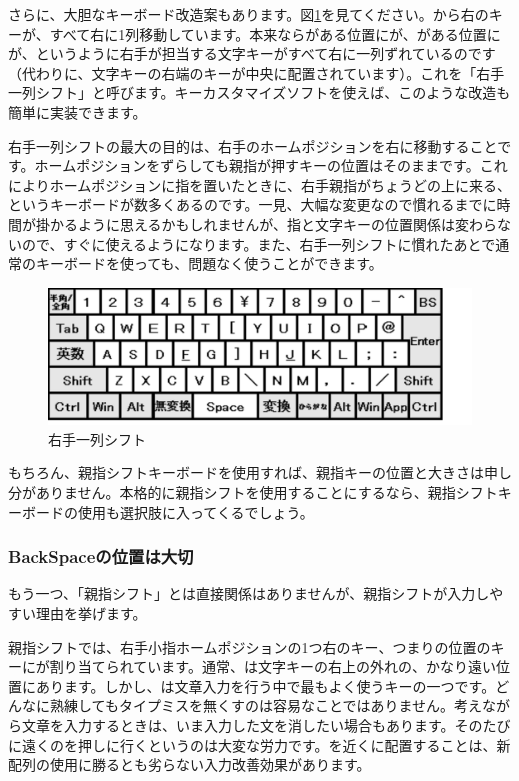 さらに、大胆なキーボード改造案もあります。図\ref{migite_1retu_shift}を見てください。から右のキーが、すべて右に1列移動しています。本来ならがある位置にが、がある位置にが、というように右手が担当する文字キーがすべて右に一列ずれているのです（代わりに、文字キーの右端のキーが中央に配置されています）。これを「右手一列シフト」と呼びます。キーカスタマイズソフトを使えば、このような改造も簡単に実装できます。

右手一列シフトの最大の目的は、右手のホームポジションを右に移動することです。ホームポジションをずらしても親指が押すキーの位置はそのままです。これによりホームポジションに指を置いたときに、右手親指がちょうどの上に来る、というキーボードが数多くあるのです。一見、大幅な変更なので慣れるまでに時間が掛かるように思えるかもしれませんが、指と文字キーの位置関係は変わらないので、すぐに使えるようになります。また、右手一列シフトに慣れたあとで通常のキーボードを使っても、問題なく使うことができます。


\begin{figure}
 \begin{center}
   \includegraphics[width=14cm,clip]{res_kouy/migite_1retu_shift.eps}
 \end{center}
 \caption{右手一列シフト}
 \label{migite_1retu_shift}
\end{figure}

もちろん、親指シフトキーボードを使用すれば、親指キーの位置と大きさは申し分がありません。本格的に親指シフトを使用することにするなら、親指シフトキーボードの使用も選択肢に入ってくるでしょう。

\subsubsection*{BackSpaceの位置は大切}

もう一つ、「親指シフト」とは直接関係はありませんが、親指シフトが入力しやすい理由を挙げます。

親指シフトでは、右手小指ホームポジションの1つ右のキー、つまり\key{:}の位置のキーにが割り当てられています。通常、は文字キーの右上の外れの、かなり遠い位置にあります。しかし、は文章入力を行う中で最もよく使うキーの一つです。どんなに熟練してもタイプミスを無くすのは容易なことではありません。考えながら文章を入力するときは、いま入力した文を消したい場合もあります。そのたびに遠くのを押しに行くというのは大変な労力です。を近くに配置することは、新配列の使用に勝るとも劣らない入力改善効果があります。


